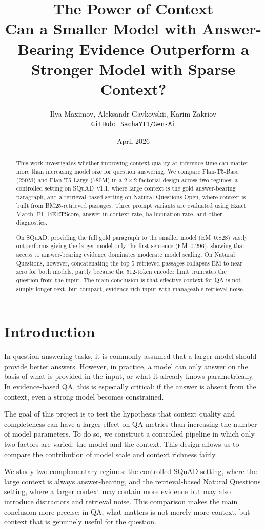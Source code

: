 \documentclass[a4paper,12pt]{article}
\title{The Power of Context \\ Can a Smaller Model with Answer-Bearing Evidence Outperform a Stronger Model with Sparse Context?}
\author{Ilya Maximov, Aleksandr Gavkovskii, Karim Zakriov \\ \texttt{GitHub: SachaYT1/Gen-Ai}}
\date{April 2026}
\begin{document}
\maketitle

\begin{abstract}
This work investigates whether improving context quality at inference time can matter more than increasing model size for question answering. We compare Flan-T5-Base (250M) and Flan-T5-Large (780M) in a $2 \times 2$ factorial design across two regimes: a controlled setting on SQuAD~v1.1, where large context is the gold answer-bearing paragraph, and a retrieval-based setting on Natural Questions Open, where context is built from BM25-retrieved passages. Three prompt variants are evaluated using Exact Match, F1, BERTScore, answer-in-context rate, hallucination rate, and other diagnostics.

On SQuAD, providing the full gold paragraph to the smaller model (EM~0.828) vastly outperforms giving the larger model only the first sentence (EM~0.296), showing that access to answer-bearing evidence dominates moderate model scaling. On Natural Questions, however, concatenating the top-5 retrieved passages collapses EM to near zero for both models, partly because the 512-token encoder limit truncates the question from the input. The main conclusion is that effective context for QA is not simply longer text, but compact, evidence-rich input with manageable retrieval noise.
\end{abstract}

\section{Introduction}
In question answering tasks, it is commonly assumed that a larger model should provide better answers. However, in practice, a model can only answer on the basis of what is provided in the input, or what it already knows parametrically. In evidence-based QA, this is especially critical: if the answer is absent from the context, even a strong model becomes constrained.

The goal of this project is to test the hypothesis that context quality and completeness can have a larger effect on QA metrics than increasing the number of model parameters. To do so, we construct a controlled pipeline in which only two factors are varied: the model and the context. This design allows us to compare the contribution of model scale and context richness fairly.

We study two complementary regimes: the controlled SQuAD setting, where the large context is always answer-bearing, and the retrieval-based Natural Questions setting, where a larger context may contain more evidence but may also introduce distractors and retrieval noise. This comparison makes the main conclusion more precise: in QA, what matters is not merely more context, but context that is genuinely useful for the question.
\end{document}
